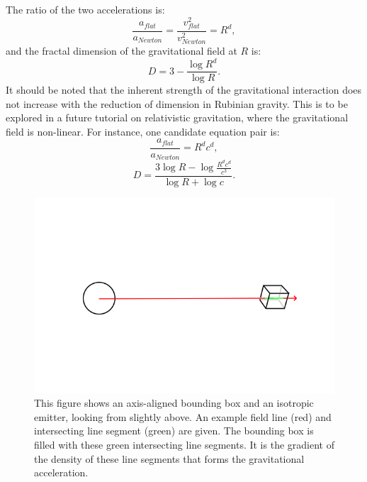 \documentclass[12pt]{article}
\begin{document}
The ratio of the two accelerations is:
\begin{equation}
\frac{a_{\textit{flat}}}{a_{\textit{Newton}}} = \frac{v_{\textit{flat}}^2}{v_{\textit{Newton}}^2} = R^{d}, 
\end{equation}
and the fractal dimension of the gravitational field at $R$ is:
\begin{equation}
D = 3 - \frac{\log R^d}{\log R}. %
\end{equation}
It should be noted that the inherent strength of the gravitational interaction does not increase with the reduction of dimension in Rubinian gravity.
This is to be explored in a future tutorial on relativistic gravitation, where the gravitational field is non-linear.
For instance, one candidate equation pair is:
\begin{equation}
\frac{a_{\textit{flat}}}{a_{\textit{Newton}}} = R^{d} c^{d},
\end{equation}
\begin{equation}
D = \frac{3 \log R  - \log \frac{R^{d} c^{d}}{c^3}}{ \log R + \log c  }.
\end{equation}




\begin{figure} 
\centering
\label{fig1}
  \includegraphics[width = 7 in]{AABB.png}
  \caption{
This figure shows an axis-aligned bounding box and an isotropic emitter, looking from slightly above.
An example field line (red) and intersecting line segment (green) are given.
The bounding box is filled with these green intersecting line segments.
It is the gradient of the density of these line segments that forms the gravitational acceleration.
}
\end{figure}
\end{document}
